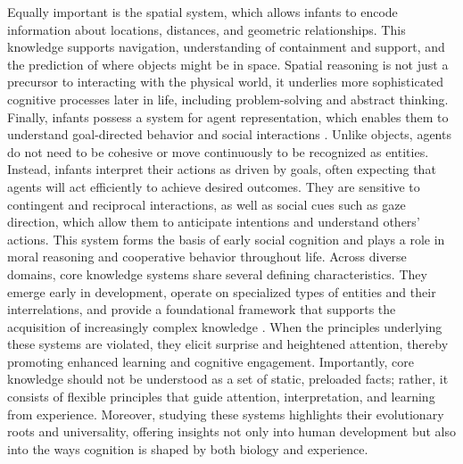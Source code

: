 \documentclass[12pt,a4paper]{report}
\begin{document}
Equally important is the spatial system, which allows infants to encode information about locations, distances, and geometric relationships. This knowledge supports navigation, understanding of containment and support, and the prediction of where objects might be in space. Spatial reasoning is not just a precursor to interacting with the physical world, it underlies more sophisticated cognitive processes later in life, including problem-solving and abstract thinking.
Finally, infants possess a system for agent representation, which enables them to understand goal-directed behavior and social interactions \cite{chiave33}. Unlike objects, agents do not need to be cohesive or move continuously to be recognized as entities. Instead, infants interpret their actions as driven by goals, often expecting that agents will act efficiently to achieve desired outcomes. They are sensitive to contingent and reciprocal interactions, as well as social cues such as gaze direction, which allow them to anticipate intentions and understand others' actions. This system forms the basis of early social cognition and plays a role in moral reasoning and cooperative behavior throughout life.
Across diverse domains, core knowledge systems share several defining characteristics. They emerge early in development, operate on specialized types of entities and their interrelations, and provide a foundational framework that supports the acquisition of increasingly complex knowledge \cite{chiave10}. When the principles underlying these systems are violated, they elicit surprise and heightened attention, thereby promoting enhanced learning and cognitive engagement. 
Importantly, core knowledge should not be understood as a set of static, preloaded facts; rather, it consists of flexible principles that guide attention, interpretation, and learning from experience. Moreover, studying these systems highlights their evolutionary roots and universality, offering insights not only into human development but also into the ways cognition is shaped by both biology and experience.
\end{document}
